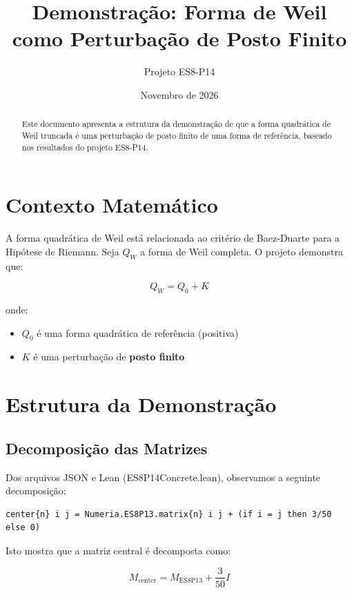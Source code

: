\documentclass[12pt,a4paper]{article}
\title{\textbf{Demonstração: Forma de Weil como Perturbação de Posto Finito}}
\author{Projeto ES8-P14}
\date{Novembro de 2026}
\theoremstyle{plain}
\theoremstyle{definition}
\theoremstyle{remark}
\begin{document}
\maketitle

\begin{abstract}
Este documento apresenta a estrutura da demonstração de que a forma quadrática de Weil truncada é uma perturbação de posto finito de uma forma de referência, baseado nos resultados do projeto ES8-P14.
\end{abstract}

\section{Contexto Matemático}

A forma quadrática de Weil está relacionada ao critério de Baez-Duarte para a Hipótese de Riemann. Seja $Q_W$ a forma de Weil completa. O projeto demonstra que:

\begin{equation}
Q_W = Q_0 + K
\end{equation}

onde:
\begin{itemize}
    \item $Q_0$ é uma forma quadrática de referência (positiva)
    \item $K$ é uma perturbação de \textbf{posto finito}
\end{itemize}

\section{Estrutura da Demonstração}

\subsection{Decomposição das Matrizes}

Dos arquivos JSON e Lean (ES8P14Concrete.lean), observamos a seguinte decomposição:

\begin{verbatim}
center{n} i j = Numeria.ES8P13.matrix{n} i j + (if i = j then 3/50 else 0)
\end{verbatim}

Isto mostra que a matriz central é decomposta como:

\begin{equation}
M_{\text{center}} = M_{\text{ES8P13}} + \frac{3}{50}I
\end{equation}
\end{document}
